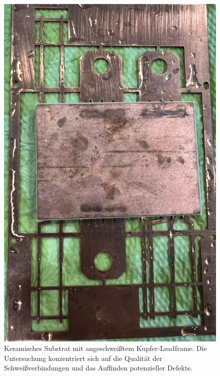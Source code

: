 \begin{figure}[htbp]
    \centering
    \includegraphics[scale=0.12]{Bilder/probe 2}
    \caption{Keramisches Substrat mit angeschweißtem Kupfer-Leadframe. Die Untersuchung konzentriert sich auf die Qualität der Schweißverbindungen und das Auffinden potenzieller Defekte.}
    \vspace{0.2cm}
    \label{Abb.4: Keramisches Substrat mit angeschweißtem Kupfer-Leadframe. Die Untersuchung konzentriert sich auf die Qualität der Schweißverbindungen und das Auffinden potenzieller Defekte. }
\end{figure} 
\vspace{0.2cm}
